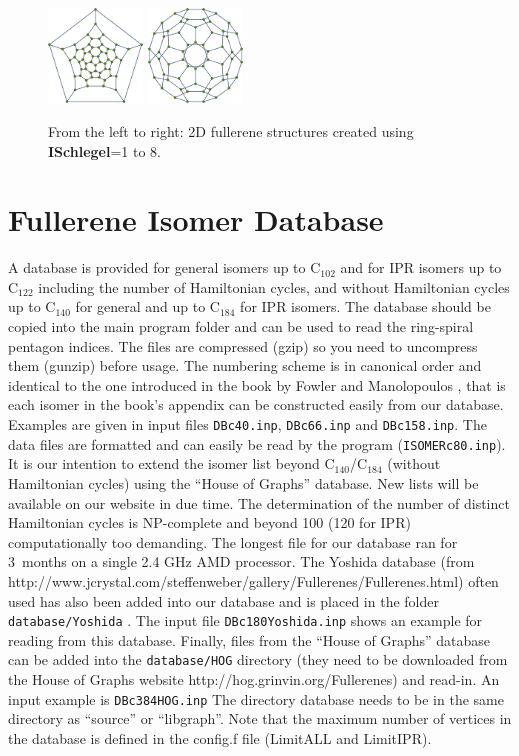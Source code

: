 \documentclass[article,a4paper,twoside]{memoir}
\newcommand{\C}[1]{\ensuremath{\mathrm{C}_{#1}}}
\newcommand{\filename}[1]{\texttt{#1}}
\newcommand{\paramname}[1]{{\color{green}\textbf{#1}}}
\begin{document}
\begin{figure}[htbp]
		 \includegraphics[width=0.225\textwidth]{Graph7.png}
		 \includegraphics[width=0.225\textwidth]{Graph8.png}
     \caption{From the left to right: 2D fullerene structures created using \paramname{ISchlegel}=1 to 8.}
     \label{pic:ManySchlegel}
 \end{figure}

\section{Fullerene Isomer Database}
A database is provided for general isomers up to \C{102} and for IPR isomers up to
\C{122} including the number of Hamiltonian cycles, and without Hamiltonian cycles
up to \C{140} for general and up to \C{184} for IPR isomers. The database should be copied into
the main program folder and can be used to read the ring-spiral pentagon indices.
The files are compressed (gzip) so you need to uncompress them (gunzip) before usage.
The numbering scheme is in canonical order and identical to the one introduced in the book by Fowler 
and Manolopoulos \cite{Atlas}, that is each isomer in the book's appendix can be 
constructed easily from our database. Examples are given in input files  \filename{DBc40.inp},
\filename{DBc66.inp} and \filename{DBc158.inp}.  The data files are formatted and can easily be read
by the program (\filename{ISOMERc80.inp}). It is our 
intention to extend the isomer list beyond \C{140}/\C{184} (without Hamiltonian cycles) using the ``House of Graphs'' database. 
New lists will be available on our website in due time.  The determination of the number of
distinct Hamiltonian cycles is NP-complete and beyond 100 (120 for IPR) 
computationally too demanding. The longest file for our database ran for 3~months on a single 2.4 GHz AMD processor.
The Yoshida database (from http://www.jcrystal.com/steffenweber/gallery/Fullerenes/Fullerenes.html) 
often used has also been added into our database and is placed in the
folder \filename{database/Yoshida} \cite{Yoshida}. The input file \filename{DBc180Yoshida.inp} shows an example for reading from
this database. Finally, files from the ``House of Graphs'' database can be added into the \filename{database/HOG} directory (they
need to be downloaded from the House of Graphs website http://hog.grinvin.org/Fullerenes) and read-in. An input example is
\filename{DBc384HOG.inp}
The directory database needs to be in the same directory as ``source'' or ``libgraph''.
Note that the maximum number of vertices in the database is defined in the config.f file (LimitALL and LimitIPR).
\end{document}
